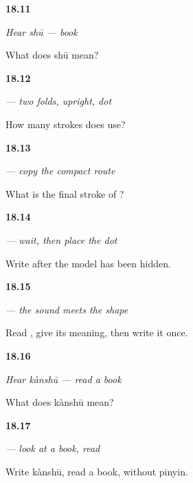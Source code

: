 \noindent\begin{minipage}[t]{\linewidth}
\raggedright
\hypertarget{review-ZH-C18-hear-shu-meaning}{\textbf{18.11}} \emph{Hear \emph{shū} — book}\par
\small What does shū mean?
\end{minipage}\par\medskip

\noindent\begin{minipage}[t]{\linewidth}
\raggedright
\hypertarget{review-ZH-W18-shu-observe-count}{\textbf{18.12}} \emph{ — two folds, upright, dot}\par
\small How many strokes does  use?
\end{minipage}\par\medskip

\noindent\begin{minipage}[t]{\linewidth}
\raggedright
\hypertarget{review-ZH-W18-shu-guided-last}{\textbf{18.13}} \emph{ — copy the compact route}\par
\small What is the final stroke of ?
\end{minipage}\par\medskip

\noindent\begin{minipage}[t]{\linewidth}
\raggedright
\hypertarget{review-ZH-W18-shu-delayed-write}{\textbf{18.14}} \emph{ — wait, then place the dot}\par
\small Write  after the model has been hidden.
\end{minipage}\par\medskip

\noindent\begin{minipage}[t]{\linewidth}
\raggedright
\hypertarget{review-ZH-C18-shu-read-write}{\textbf{18.15}} \emph{ — the sound meets the shape}\par
\small Read , give its meaning, then write it once.
\end{minipage}\par\medskip

\noindent\begin{minipage}[t]{\linewidth}
\raggedright
\hypertarget{review-ZH-C18-hear-kanshu-meaning}{\textbf{18.16}} \emph{Hear \emph{kànshū} — read a book}\par
\small What does kànshū mean?
\end{minipage}\par\medskip

\noindent\begin{minipage}[t]{\linewidth}
\raggedright
\hypertarget{review-ZH-C18-kanshu-write}{\textbf{18.17}} \emph{ — look at a book, read}\par
\small Write kànshū, read a book, without pinyin.
\end{minipage}\par\medskip

